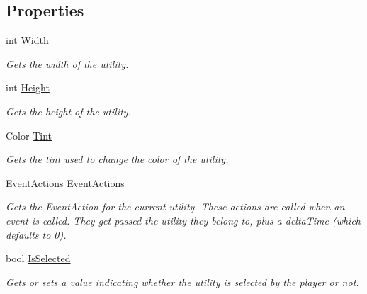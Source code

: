 \subsection*{Properties}
\begin{DoxyCompactItemize}
\item 
int \hyperlink{class_utility_a8ca5cdd9830db40c5a4d424eb65c31a5}{Width}
\begin{DoxyCompactList}\small\item\em Gets the width of the utility. \end{DoxyCompactList}\item 
int \hyperlink{class_utility_af3f8e91c0b54c05fa5e0306af9ab47d3}{Height}
\begin{DoxyCompactList}\small\item\em Gets the height of the utility. \end{DoxyCompactList}\item 
Color \hyperlink{class_utility_ab87189fd3ca0e6d448cabfe254ded0cb}{Tint}
\begin{DoxyCompactList}\small\item\em Gets the tint used to change the color of the utility. \end{DoxyCompactList}\item 
\hyperlink{class_event_actions}{Event\+Actions} \hyperlink{class_utility_a186a1d1f22ab01e15ac65aff6961eb64}{Event\+Actions}
\begin{DoxyCompactList}\small\item\em Gets the Event\+Action for the current utility. These actions are called when an event is called. They get passed the utility they belong to, plus a delta\+Time (which defaults to 0). \end{DoxyCompactList}\item 
bool \hyperlink{class_utility_a51c3ffb57defa6be90a9d12cbf43902c}{Is\+Selected}
\begin{DoxyCompactList}\small\item\em Gets or sets a value indicating whether the utility is selected by the player or not. \end{DoxyCompactList}\item 

\end{DoxyCompactItemize}
